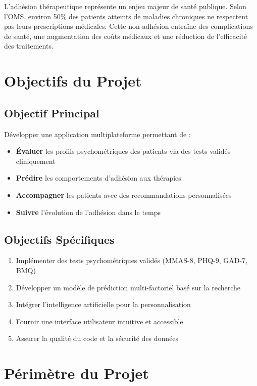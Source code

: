 \documentclass[12pt,a4paper]{report}
\begin{document}
L'adhésion thérapeutique représente un enjeu majeur de santé publique. Selon l'OMS, environ 50\% des patients atteints de maladies chroniques ne respectent pas leurs prescriptions médicales. Cette non-adhésion entraîne des complications de santé, une augmentation des coûts médicaux et une réduction de l'efficacité des traitements.

\section{Objectifs du Projet}

\subsection{Objectif Principal}
Développer une application multiplateforme permettant de :
\begin{itemize}
    \item \textbf{Évaluer} les profils psychométriques des patients via des tests validés cliniquement
    \item \textbf{Prédire} les comportements d'adhésion aux thérapies
    \item \textbf{Accompagner} les patients avec des recommandations personnalisées
    \item \textbf{Suivre} l'évolution de l'adhésion dans le temps
\end{itemize}

\subsection{Objectifs Spécifiques}
\begin{enumerate}
    \item Implémenter des tests psychométriques validés (MMAS-8, PHQ-9, GAD-7, BMQ)
    \item Développer un modèle de prédiction multi-factoriel basé sur la recherche
    \item Intégrer l'intelligence artificielle pour la personnalisation
    \item Fournir une interface utilisateur intuitive et accessible
    \item Assurer la qualité du code et la sécurité des données
\end{enumerate}

\section{Périmètre du Projet}
\end{document}
